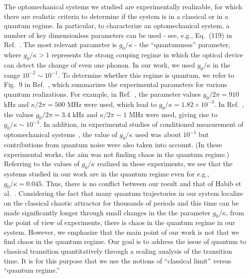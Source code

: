 \documentclass[12pt]{wlscirep}
\begin{document}
The optomechanical systems we studied are experimentally realizable, for
which there are realistic criteria to determine if the system is in a
classical or in a quantum regime. In particular, to characterize an
optomechanical system, a number of key dimensionless parameters can be used
- see, e.g., Eq.~(119) in Ref.~\cite{AKM:2014}.
The most relevant parameter is $g_0/\kappa$ - the
``quantumness'' parameter, where $g_0/\kappa>1$ represents the strong couping
regime in which the optical device can detect the change of even one
phonon. In our work, we used $g_0/\kappa$ in the range $10^{-2}\sim10^{-1}$.
To determine whether this regime is quantum, we refer to Fig.~9 
in Ref.~\cite{AKM:2014}, which summarizes the
experimental parameters for various quantum realizations.
For example, in Ref.~\cite{CASHKGAP:2011}, the parameter
values $g_0/2\pi=910$ kHz and $\kappa/2\pi=500$ MHz were used, which lead to
$g_0/\kappa=1.82\times10^{-3}$. In Ref.~\cite{VDWSK:2012}, 
the values $g_0/2\pi=3.4$ kHz and $\kappa/2\pi\sim 1$ MHz were used,
giving rise to $g_0/\kappa\sim10^{-3}$. In addition, in experimental
studies of conditioned measurement of optomechanical systems~\cite{WHHRHA:2015},
the value of $g_0/\kappa$ used was about $10^{-5}$ but contributions from 
quantum noise were also taken into account. (In these experimental works, the aim 
was not finding chaos in the quantum regime.) Referring to the values of 
$g_0/\kappa$ realized in these experiments, we see that the systems studied 
in our work are in the quantum regime even for e.g., $g_0/\kappa=0.045$.
Thus, there is no conflict between our result and that of 
Habib et al.~\cite{GADBH:2004,HJS:2006}.
Considering the fact that many quantum trajectories in our system localize
on the classical chaotic attractor for thousands of periods and this time
can be made significantly longer through small changes in the the parameter
$g_0/\kappa$, from the point of view of experiments, there is chaos in
the quantum regime in our system. However, we emphasize that the main point 
of our work is not that we find chaos in the quantum regime. Our goal is to 
address the issue of quantum to classical transition quantitatively through 
a scaling analysis of the transition time. It is for this purpose that we use the
notions of ``classical limit'' versus ``quantum regime.'' 
 
\end{document}
